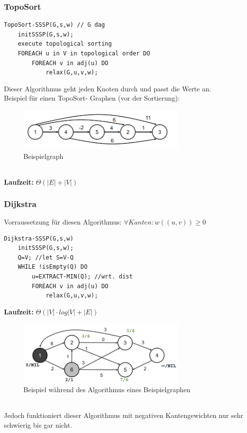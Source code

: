 \documentclass{article}
\begin{document}
            \subsubsection{TopoSort}
                \begin{lstlisting}[style=pseudocode]
TopoSort-SSSP(G,s,w) // G dag
    initSSSP(G,s,w);
    execute topological sorting
    FOREACH u in V in topological order DO
        FOREACH v in adj(u) DO
            relax(G,u,v,w);
                \end{lstlisting}
                Dieser Algorithmus geht jeden Knoten durch und passt die Werte an.\\
                Beispiel für einen TopoSort- Graphen (vor der Sortierung):\\
                \begin{figure}[ht]
                    \centering
                    \includegraphics[width=0.75\textwidth]{Bilder/Topo.png}
                    \caption{Beispielgraph}
                    \label{fig:Topo}
                \end{figure}\\
                \textbf{Laufzeit:} $\Theta (|E|+|V|)$
            \subsubsection{Dijkstra}
                Vorraussetzung für diesen Algorithmus: $\forall Kanten: w((u,v))\geq 0$\\
                \begin{lstlisting}[style=pseudocode]
Dijkstra-SSSP(G,s,w)
    initSSSP(G,s,w);
    Q=V; //let S=V-Q
    WHILE !isEmpty(Q) DO
        u=EXTRACT-MIN(Q); //wrt. dist
        FOREACH v in adj(u) DO
            relax(G,u,v,w);
                \end{lstlisting}
                \textbf{Laufzeit:} $\Theta (|V|\cdot log|V|+|E|)$\\
                \begin{figure}[ht]
                    \centering
                    \includegraphics[width=0.75\textwidth]{Bilder/Dijkstra.png}
                    \caption{Beispiel während des Algorithmus eines Beispielgraphen}
                    \label{fig:Dijkstra}
                \end{figure}\\
                Jedoch funktioniert dieser Algorithmus mit negativen Kantengewichten nur sehr schwierig bis gar nicht.
\end{document}

